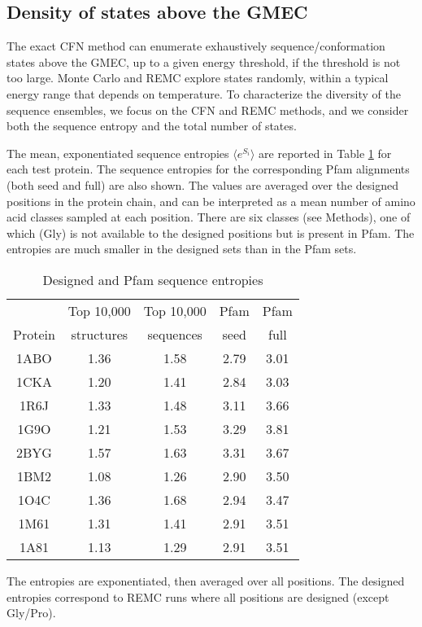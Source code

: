 {{\subsection{Density of states above the GMEC}
The exact CFN method can enumerate exhaustively sequence/conformation states above the GMEC, up to a given energy
threshold, if the threshold is not too large. Monte Carlo and REMC explore states randomly, within a typical energy
range that depends on temperature. To characterize the diversity of the sequence ensembles, we focus on the CFN and
REMC methods, and we consider both the sequence entropy and the total number of states. 

The mean, exponentiated sequence entropies $\langle e^{S_i}\rangle$ are reported in Table \ref{tab:entropy} for each
test protein. The sequence entropies for the corresponding Pfam alignments (both seed and full) are also shown. The
values are averaged over the designed positions in the protein chain, and can be interpreted as a mean number of amino
acid classes sampled at each position. There are six classes (see Methods), one of which (Gly) is not available to the
designed positions but is present in Pfam. The entropies are much smaller in the designed sets than in the Pfam sets.


\begin{table}[!htbp]                            
\caption{Designed and Pfam sequence entropies}
\label{tab:entropy}                      
\begin{center}
\begin{tabular}{ccccc} \hline \hline  
        & Top 10,000 & Top 10,000 & Pfam & Pfam \\
Protein & structures & sequences  & seed & full \\ \hline
1ABO & 1.36 & 1.58 & 2.79 & 3.01 \\
1CKA & 1.20 & 1.41 & 2.84 & 3.03 \\
1R6J & 1.33 & 1.48 & 3.11 & 3.66 \\
1G9O & 1.21 & 1.53 & 3.29 & 3.81 \\
2BYG & 1.57 & 1.63 & 3.31 & 3.67 \\
1BM2 & 1.08 & 1.26 & 2.90 & 3.50 \\
1O4C & 1.36 & 1.68 & 2.94 & 3.47 \\
1M61 & 1.31 & 1.41 & 2.91 & 3.51 \\
1A81 & 1.13 & 1.29 & 2.91 & 3.51 \\ \hline
\end{tabular}
\end{center}
{\small \noindent The entropies are exponentiated, then averaged over all positions.
The designed entropies correspond to REMC runs where all positions are designed (except Gly/Pro).}
\end{table}


}}
